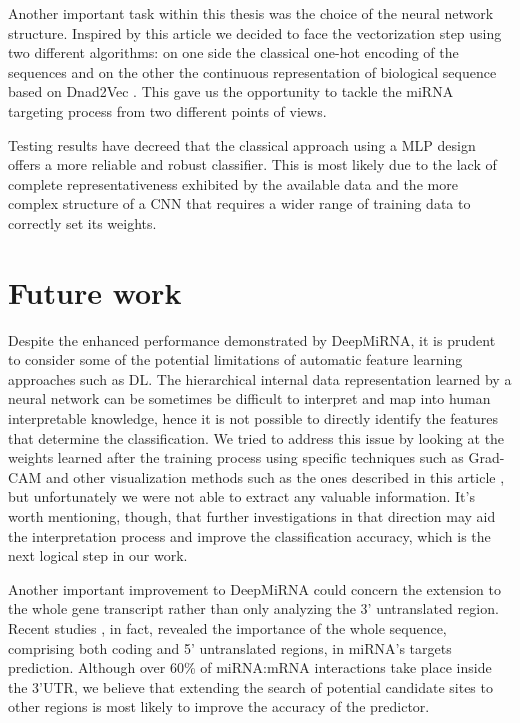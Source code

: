 Another important task within this thesis was the choice of the neural network structure. Inspired by this article \cite{continuous_representation} we decided to face the vectorization step using two different algorithms: on one side the classical one-hot encoding of the sequences and on the other the continuous representation of biological sequence based on Dnad2Vec \cite{dna_distributed_repr}. This gave us the opportunity to tackle the miRNA targeting process from two different points of views.

Testing results have decreed that the classical approach using a MLP design offers a more reliable and robust classifier. This is most likely due to the lack of complete representativeness exhibited by the available data and the more complex structure of a CNN that requires a wider range of training data to correctly set its weights. 

\section{Future work}
Despite the enhanced performance demonstrated by DeepMiRNA, it is prudent to consider
some of the potential limitations of automatic feature learning approaches such as DL. The hierarchical internal data representation learned by a neural network can be sometimes be difficult to interpret and map into human interpretable knowledge, hence it is not possible to directly identify the features that determine the classification. We tried to address this issue by looking at the weights learned after the training process using specific techniques such as Grad-CAM \cite{gradcam} and other visualization methods such as the ones described in this article \cite{nlp_visualizing}, but unfortunately we were not able to extract any valuable information. It's worth mentioning, though, that further investigations in that direction may aid the interpretation process and improve the classification accuracy, which is the next logical step in our work.

Another important improvement to DeepMiRNA could concern the extension to the whole gene transcript rather than only analyzing the 3' untranslated region. Recent studies \cite{mirwalk} \cite{helwak}, in fact, revealed the importance of the whole sequence, comprising both coding and 5' untranslated regions, in miRNA's targets prediction. Although over 60\% of miRNA:mRNA interactions take place inside the 3'UTR, we believe that extending the search of potential candidate sites to other regions is most likely to improve the accuracy of the predictor. 

